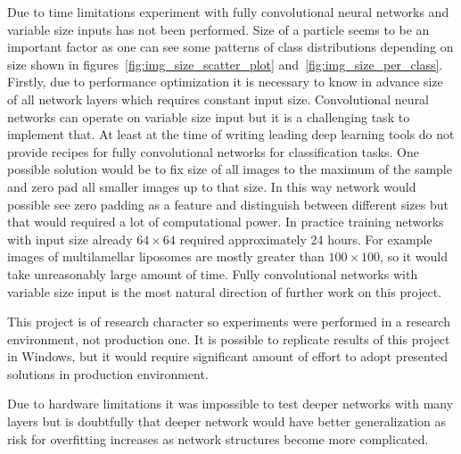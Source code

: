 \documentclass[a4paper, 11pt, table]{article}
\begin{document}
Due to time limitations experiment with fully convolutional neural networks and variable size inputs has not been performed. Size of a particle seems to be an important factor as one can see some patterns of class distributions depending on size shown in figures~\ref{fig:img_size_scatter_plot} and~\ref{fig:img_size_per_class}. Firstly, due to performance optimization it is necessary to know in advance size of all network layers which requires constant input size. Convolutional neural networks can operate on variable size input but it is a challenging task to implement that. At least at the time of writing leading deep learning tools do not provide recipes for fully convolutional networks for classification tasks. One possible solution would be to fix size of all images to the maximum of the sample and zero pad all smaller images up to that size. In this way network would possible see zero padding as a feature and distinguish between different sizes but that would required a lot of computational power. In practice training networks with input size already $64 \times 64$ required approximately 24 hours. For example images of multilamellar liposomes are mostly greater than $100 \times 100$, so it would take unreasonably large amount of time. Fully convolutional networks with variable size input is the most natural direction of further work on this project.

\medskip

This project is of research character so experiments were performed in a research environment, not production one. It is possible to replicate results of this project in Windows, but it would require significant amount of effort to adopt presented solutions in production environment.

\medskip

Due to hardware limitations it was impossible to test deeper networks with many layers but is doubtfully that deeper network would have better generalization as risk for overfitting increases as network structures become more complicated.

\printbibliography
\end{document}
